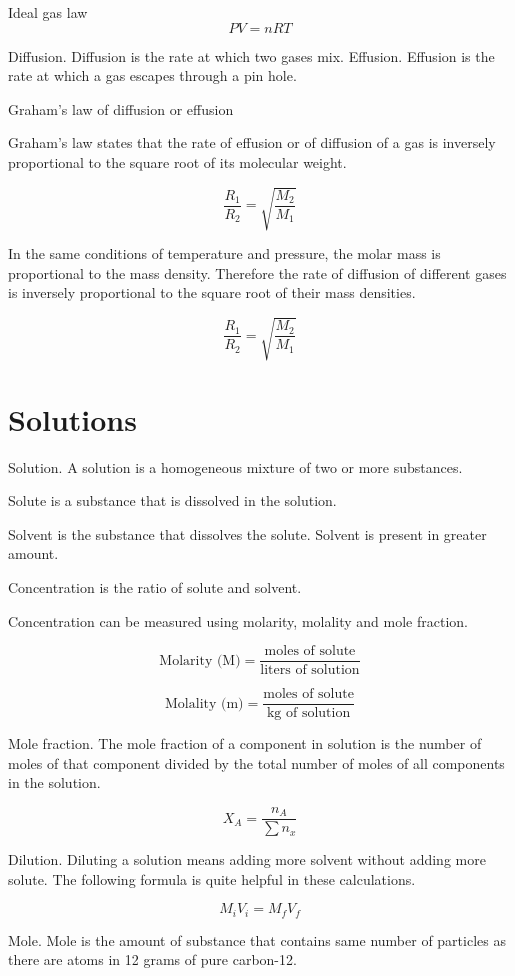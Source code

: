 \documentclass[oneside]{book}
\begin{document}
Ideal gas law
\[PV = nRT\]

Diffusion. Diffusion is the rate at which two gases mix.
Effusion. Effusion is the rate at which a gas escapes through a pin hole.

Graham's law of diffusion or effusion

Graham's law states that the rate of effusion or of diffusion of a gas is
inversely proportional to the square root of its molecular weight.

\[\frac{R_1}{R_2} = \sqrt{\frac{M_2}{M_1}}\]

In the same conditions of temperature and pressure, the molar mass is
proportional to the mass density. Therefore the rate of diffusion of different
gases is inversely proportional to the square root of their mass densities.

\[\frac{R_1}{R_2} = \sqrt{\frac{M_2}{M_1}}\]

\chapter{Solutions}

Solution. A solution is a homogeneous mixture of two or more substances.

Solute is a substance that is dissolved in the solution.

Solvent is the substance that dissolves the solute. Solvent is present in
greater amount.

Concentration is the ratio of solute and solvent.

Concentration can be measured using molarity, molality and mole fraction.

\[\text{Molarity (M)} = \frac{\text{moles of solute}}{\text{liters of
solution}}\]

\[\text{Molality (m)} = \frac{\text{moles of solute}}{\text{kg of solution}}\]

Mole fraction. The mole fraction of a component in solution is the number of
moles of that component divided by the total number of moles of all components
in the solution.

\[X_A = \frac{n_A}{\sum{n_x}}\]

Dilution. Diluting a solution means adding more solvent without adding more
solute.
The following formula is quite helpful in these calculations.

\[M_i V_i = M_f V_f\]

Mole. Mole is the amount of substance that contains same number of particles as
there are atoms in 12 grams of pure carbon-12.
\end{document}
